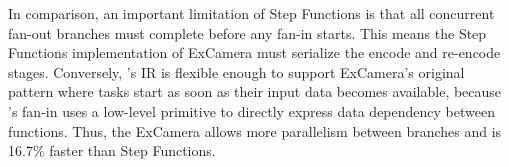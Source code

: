 In comparison, an important limitation of Step Functions is that all concurrent
fan-out branches must complete before any fan-in starts. This means the Step
Functions implementation of ExCamera must serialize the encode and re-encode
stages.  Conversely, \name{}'s IR is flexible enough to support ExCamera's
original pattern where tasks start as soon as their input data becomes
available, because \name{}'s fan-in uses a low-level primitive to directly
express data dependency between functions. Thus, the \name{} ExCamera allows
more parallelism between branches and is 16.7\% faster than Step Functions.








